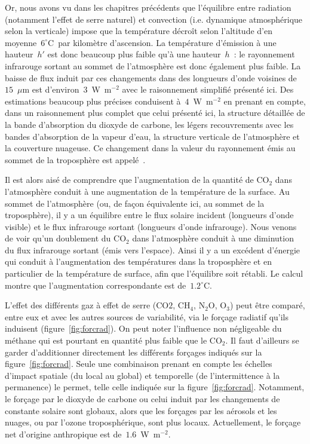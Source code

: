 \sk
Or, nous avons vu dans les chapitres précédents que l'équilibre entre radiation (notamment l'effet de serre naturel) et convection (i.e. dynamique atmosphérique selon la verticale) impose que la température décroît selon l'altitude d'en moyenne~$6^{\circ}$C~par kilomètre d'ascension. La température d'émission à une hauteur~$h'$ est donc beaucoup plus faible qu'à une hauteur~$h$~: le rayonnement infrarouge sortant au sommet de l'atmosphère est donc également plus faible. La baisse de flux induit par ces changements dans des longueurs d'onde voisines de~$15$~$\mu$m est d'environ~$3$~W~m$^{-2}$ avec le raisonnement simplifié présenté ici. Des estimations beaucoup plus précises conduisent à~$4$~W~m$^{-2}$ en prenant en compte, dans un raisonnement plus complet que celui présenté ici, la structure détaillée de la bande d'absorption du dioxyde de carbone, les légers recouvrements avec les bandes d'absorption de la vapeur d'eau, la structure verticale de l'atmosphère et la couverture nuageuse. Ce changement dans la valeur du rayonnement émis au sommet de la troposphère est appelé~. 

\sk
Il est alors aisé de comprendre que l'augmentation de la quantité de CO$_2$ dans l'atmosphère conduit à une augmentation de la température de la surface. Au sommet de l'atmosphère (ou, de façon équivalente ici, au sommet de la troposphère), il y a un équilibre entre le flux solaire incident (longueurs d'onde visible) et le flux infrarouge sortant (longueurs d'onde infrarouge). Nous venons de voir qu'un doublement du CO$_2$ dans l'atmosphère conduit à une diminution du flux infrarouge sortant (émis vers l'espace). Ainsi il y a un excédent d'énergie qui conduit à l'augmentation des températures dans la troposphère et en particulier de la température de surface, afin que l'équilibre soit rétabli. Le calcul montre que l'augmentation correspondante est de~$1.2^{\circ}$C. 

\sk
L'effet des différents gaz à effet de serre (CO$2$, CH$_4$, N$_2$O, O$_3$) peut être comparé, entre eux et avec les autres sources de variabilité, via le forçage radiatif qu'ils induisent (figure~\ref{fig:forcrad}). On peut noter l'influence non négligeable du méthane qui est pourtant en quantité plus faible que le CO$_2$. Il faut d'ailleurs se garder d'additionner directement les différents forçages indiqués sur la figure~\ref{fig:forcrad}. Seule une combinaison prenant en compte les échelles d'impact spatiale (du local au global) et temporelle (de l'intermittence à la permanence) le permet, telle celle indiquée sur la figure~\ref{fig:forcrad}. Notamment, le forçage par le dioxyde de carbone ou celui induit par les changements de constante solaire sont globaux, alors que les forçages par les aérosols et les nuages, ou par l'ozone troposphérique, sont plus locaux. Actuellement, le forçage net d'origine anthropique est de~$1.6$~W~m$^{-2}$.

